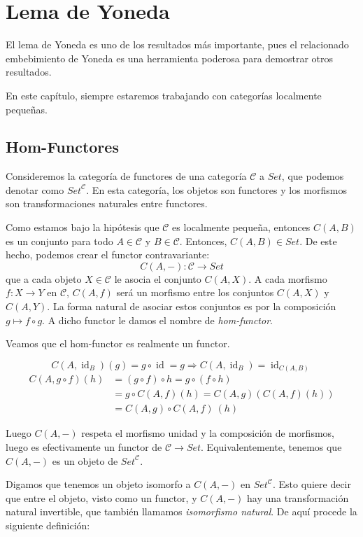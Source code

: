 \documentclass[12pt, twoside]{book}
\newcommand{\newterm}[1]{\index{#1}\emph{#1}}
\newcommand{\cat}{{\mathcal{C}}}
\newcommand{\Set}{{Set}}
\DeclareMathOperator{\id}{id}
\begin{document}
\chapter{Lema de Yoneda}

El lema de Yoneda es uno de los resultados más importante, pues el relacionado embebimiento de Yoneda es una herramienta poderosa para demostrar otros resultados.

En este capítulo, siempre estaremos trabajando con categorías localmente pequeñas.

\section{Hom-Functores}
Consideremos la categoría de functores de una categoría $\cat$ a $\Set$, que podemos denotar como $\Set^\cat$.
En esta categoría, los objetos son functores y los morfismos son transformaciones naturales entre functores.

Como estamos bajo la hipótesis que $\cat$ es localmente pequeña, entonces $C(A,B)$ es un conjunto para todo $A \in \cat$ y $B \in \cat$.
Entonces, $C(A,B) \in \Set$.
De este hecho, podemos crear el functor contravariante:
\[ C(A,-) \colon \cat \to \Set \]
que a cada objeto $X \in \cat$ le asocia el conjunto $C(A,X)$.
A cada morfismo $f \colon X \to Y$ en $\cat$, $C(A,f)$ será un morfismo entre los conjuntos $C(A,X)$ y $C(A,Y)$.
La forma natural de asociar estos conjuntos es por la composición $g \mapsto f \circ g$.
A dicho functor le damos el nombre de \newterm{hom-functor}.

Veamos que el hom-functor es realmente un functor.

\[ C(A,\id_B)(g) = g \circ \id = g \Rightarrow C(A,\id_B) = \id_{C(A,B)} \]
\begin{align*}
C(A,g \circ f)(h) & = (g \circ f) \circ h = g \circ (f \circ h)\\
& = g \circ C(A,f)(h) = C(A,g)(C(A,f)(h))\\
& = C(A,g) \circ C(A,f)\ (h)
\end{align*}

Luego $C(A,-)$ respeta el morfismo unidad y la composición de morfismos, luego es efectivamente un functor de $\cat \to \Set$.
Equivalentemente, tenemos que $C(A,-)$ es un objeto de $\Set^\cat$.

Digamos que tenemos un objeto isomorfo a $C(A,-)$ en $\Set^\cat$.
Esto quiere decir que entre el objeto, visto como un functor, y $C(A,-)$ hay una transformación natural invertible, que también llamamos \newterm{isomorfismo natural}.
De aquí procede la siguiente definición: 
\end{document}
